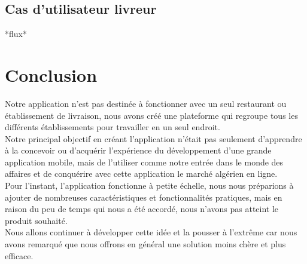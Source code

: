 \documentclass[french, a4paper, 12pt]{report}
\begin{document}
	\section{Cas d'utilisateur livreur} *flux*

\newpage
\chapter*{Conclusion}
Notre application n'est pas destinée à fonctionner avec un seul restaurant ou établissement de livraison, nous avons créé une plateforme qui regroupe tous les différents établissements pour travailler en un seul endroit.\\


Notre principal objectif en créant l'application n'était pas seulement d'apprendre à la concevoir ou d'acquérir l'expérience du développement d'une grande application mobile, mais de l'utiliser comme notre entrée dans le monde des affaires et de conquérire avec cette application le marché algérien en ligne.\\


Pour l'instant, l'application fonctionne à petite échelle, nous nous préparions à ajouter de nombreuses caractéristiques et fonctionnalités pratiques, mais en raison du peu de temps qui nous a été accordé, nous n'avons pas atteint le produit souhaité.\\


Nous allons continuer à développer cette idée et la pousser à l'extrême car nous avons remarqué que nous offrons en général une solution moins chère et plus efficace.


\newpage
\begin{thebibliography}{300}
\end{thebibliography}
\end{document}
